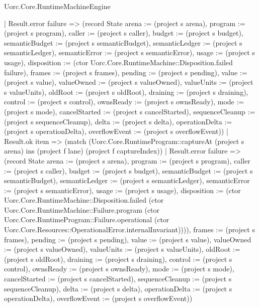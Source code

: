 \begin{lexlean}{Uorc.Core.RuntimeMachineEngine}
\begin{semanticmodule}
{            | Result.error failure => (record State {arena := (project s arena), program := (project s program), caller := (project s caller), budget := (project s budget), semanticBudget := (project s semanticBudget), semanticLedger := (project s semanticLedger), semanticError := (project s semanticError), usage := (project s usage), disposition := (ctor Uorc.Core.RuntimeMachine::Disposition.failed failure), frames := (project s frames), pending := (project s pending), value := (project s value), valueOwned := (project s valueOwned), valueUnits := (project s valueUnits), oldRoot := (project s oldRoot), draining := (project s draining), control := (project s control), ownsReady := (project s ownsReady), mode := (project s mode), cancelStarted := (project s cancelStarted), sequenceCleanup := (project s sequenceCleanup), delta := (project s delta), operationDelta := (project s operationDelta), overflowEvent := (project s overflowEvent)})
            | Result.ok item => (match (Uorc.Core.RuntimeProgram::captureAt (project s arena) ins (project f lane) (project f captureIndex))
              | Result.error failure => (record State {arena := (project s arena), program := (project s program), caller := (project s caller), budget := (project s budget), semanticBudget := (project s semanticBudget), semanticLedger := (project s semanticLedger), semanticError := (project s semanticError), usage := (project s usage), disposition := (ctor Uorc.Core.RuntimeMachine::Disposition.failed (ctor Uorc.Core.RuntimeMachine::Failure.program (ctor Uorc.Core.RuntimeProgram::Failure.operational (ctor Uorc.Core.Resources::OperationalError.internalInvariant)))), frames := (project s frames), pending := (project s pending), value := (project s value), valueOwned := (project s valueOwned), valueUnits := (project s valueUnits), oldRoot := (project s oldRoot), draining := (project s draining), control := (project s control), ownsReady := (project s ownsReady), mode := (project s mode), cancelStarted := (project s cancelStarted), sequenceCleanup := (project s sequenceCleanup), delta := (project s delta), operationDelta := (project s operationDelta), overflowEvent := (project s overflowEvent)})
}
\end{semanticmodule}
\end{lexlean}
